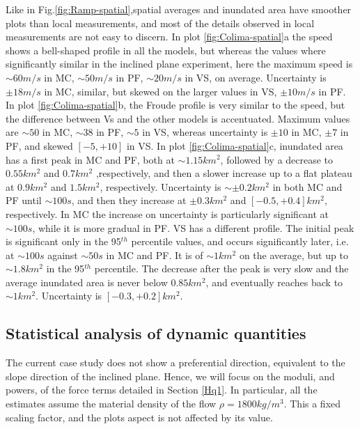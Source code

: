 \documentclass{article}
\begin{document}
Like in Fig.\ref{fig:Ramp-spatial},spatial averages and inundated area have smoother plots than local measurements, and most of the details observed in local measurements are not easy to discern. In plot \ref{fig:Colima-spatial}a the speed shows a bell-shaped profile in all the models, but whereas the values where significantly similar in the inclined plane experiment, here the maximum speed is $\sim 60 m/s$ in MC, $\sim 50 m/s$ in PF, $\sim 20 m/s$ in VS, on average. Uncertainty is $\pm 18 m/s$ in MC, similar, but skewed on the larger values in VS, $\pm 10 m/s$ in PF. In plot \ref{fig:Colima-spatial}b, the Froude profile is very similar to the speed, but the difference between Vs and the other models is accentuated. Maximum values are $\sim 50$ in MC, $\sim 38$ in PF, $\sim 5$ in VS, whereas uncertainty is $\pm 10$ in MC, $\pm 7$ in PF, and skewed $[-5, +10]$ in VS. In plot \ref{fig:Colima-spatial}c, inundated area has a first peak in MC and PF, both at $\sim 1.15 km^2$, followed by a decrease to $0.55 km^2$ and $0.7 km^2$ ,respectively, and then a slower increase up to a flat plateau at $0.9 km^2$ and $1.5 km^2$, respectively. Uncertainty is $\sim \pm 0.2 km^2$ in both MC and PF until $\sim 100 s$, and then they increase at $\pm 0.3 km^2$ and $[-0.5, +0.4] km^2$, respectively. In MC the increase on uncertainty is particularly significant at $\sim 100 s$, while it is more gradual in PF. VS has a different profile. The initial peak is significant only in the 95$^{th}$ percentile values, and occurs significantly later, i.e. at $\sim 100 s$ against $\sim 50 s$ in MC and PF. It is of $\sim 1 km^2$ on the average, but up to $\sim 1.8 km^2$ in the 95$^{th}$ percentile. The decrease after the peak is very slow and the average inundated area is never below $0.85 km^2$, and eventually reaches back to $\sim 1 km^2$. Uncertainty is $[-0.3, +0.2] km^2$.

\subsection{Statistical analysis of dynamic quantities}\label{Hq2}
The current case study does not show a preferential direction, equivalent to the slope direction of the inclined plane. Hence, we will focus on the moduli, and powers, of the force terms detailed in Section \ref{Hq1}. In particular, all the estimates assume the material density of the flow $\rho = 1800 kg/m^3$. This a fixed scaling factor, and the plots aspect is not affected by its value.
\end{document}
